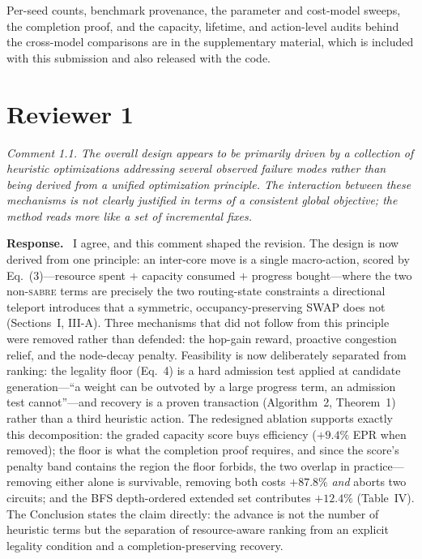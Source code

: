\documentclass[11pt]{article}
\newcommand{\SABRE}{\textsc{sabre}}
\newenvironment{comment}{\medskip\noindent\itshape}{\par}
\newcommand{\response}{\smallskip\noindent\textbf{Response.}\ }
\begin{document}
\medskip\noindent
Per-seed counts, benchmark provenance, the parameter and cost-model sweeps, the
completion proof, and the capacity, lifetime, and action-level audits behind
the cross-model comparisons are in the supplementary material, which is
included with this submission and also released with the code.

\clearpage
\section*{Reviewer 1}

\begin{comment}
Comment 1.1. The overall design appears to be primarily driven by a collection
of heuristic optimizations addressing several observed failure modes rather
than being derived from a unified optimization principle. The interaction
between these mechanisms is not clearly justified in terms of a consistent
global objective; the method reads more like a set of incremental fixes.
\end{comment}

\response
I agree, and this comment shaped the revision. The design is now derived from
one principle: an inter-core move is a single macro-action, scored by
Eq.~(3)---resource spent $+$ capacity consumed $+$ progress bought---where the
two non-\SABRE{} terms are precisely the two routing-state constraints a
directional teleport introduces that a symmetric, occupancy-preserving SWAP
does not (Sections~I, III-A). Three mechanisms that did not follow from this
principle were removed rather than defended: the hop-gain reward, proactive
congestion relief, and the node-decay penalty. Feasibility is now deliberately
separated from ranking: the legality floor (Eq.~4) is a hard admission test
applied at candidate generation---``a weight can be outvoted by a large
progress term, an admission test cannot''---and recovery is a proven
transaction (Algorithm~2, Theorem~1) rather than a third heuristic action. The
redesigned ablation supports exactly this decomposition: the graded capacity
score buys efficiency ($+9.4\%$ EPR when removed); the floor is what the
completion proof requires, and since the score's penalty band contains the
region the floor forbids, the two overlap in practice---removing either alone
is survivable, removing both costs $+87.8\%$ \emph{and} aborts two circuits;
and the BFS depth-ordered extended set contributes $+12.4\%$ (Table~IV). The Conclusion
states the claim directly: the advance is not the number of heuristic terms
but the separation of resource-aware ranking from an explicit legality
condition and a completion-preserving recovery.
\end{document}
